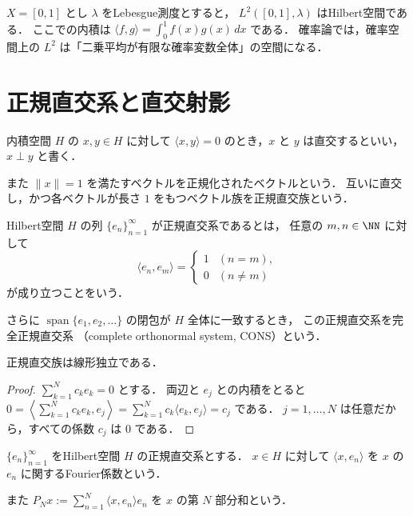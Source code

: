\begin{example}
$X=[0,1]$ とし $\lambda$ をLebesgue測度とすると，
$L^2([0,1],\lambda)$ はHilbert空間である．
ここでの内積は $\langle f,g\rangle=\int_0^1 f(x)g(x)\,dx$ である．
確率論では，確率空間上の $L^2$ は「二乗平均が有限な確率変数全体」の空間になる．
\end{example}

\section{正規直交系と直交射影}

\begin{definition}[直交と正規直交]
内積空間 $H$ の $x,y\in H$ に対して
$\langle x,y\rangle=0$ のとき，$x$ と $y$ は直交するといい，$x\perp y$ と書く．

また $\|x\|=1$ を満たすベクトルを正規化されたベクトルという．
互いに直交し，かつ各ベクトルが長さ $1$ をもつベクトル族を正規直交族という．
\end{definition}

\begin{definition}[正規直交系とCONS]
Hilbert空間 $H$ の列 $\{e_n\}_{n=1}^{\infty}$ が正規直交系であるとは，
任意の $m,n\in\NN$ に対して
\[
\langle e_n,e_m\rangle=
\begin{cases}
1 & (n=m),\\
0 & (n\ne m)
\end{cases}
\]
が成り立つことをいう．

さらに
$\operatorname{span}\{e_1,e_2,\dots\}$ の閉包が $H$ 全体に一致するとき，
この正規直交系を完全正規直交系
（complete orthonormal system, CONS）という．
\end{definition}

\begin{proposition}
正規直交族は線形独立である．
\end{proposition}
\begin{proof}
$\sum_{k=1}^N c_k e_k=0$ とする．
両辺と $e_j$ との内積をとると
$0=\left\langle \sum_{k=1}^N c_k e_k,e_j\right\rangle
=\sum_{k=1}^N c_k \langle e_k,e_j\rangle=c_j$ である．
$j=1,\dots,N$ は任意だから，すべての係数 $c_j$ は $0$ である．
\end{proof}

\begin{definition}[Fourier係数と部分和]
$\{e_n\}_{n=1}^{\infty}$ をHilbert空間 $H$ の正規直交系とする．
$x\in H$ に対して
$\langle x,e_n\rangle$ を $x$ の $e_n$ に関するFourier係数という．

また
$P_Nx:=\sum_{n=1}^N \langle x,e_n\rangle e_n$ を $x$ の第 $N$ 部分和という．
\end{definition}

